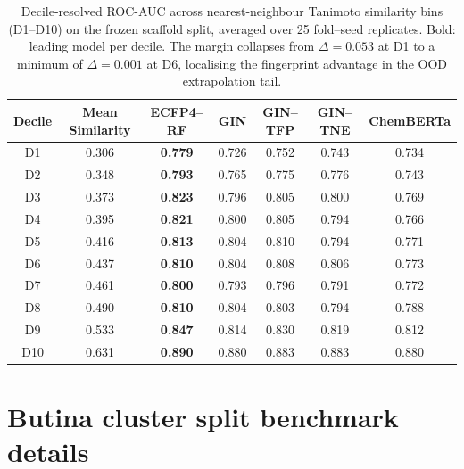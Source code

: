 \documentclass[11pt,a4paper]{article}
\begin{document}
\begin{table}[h]
\centering
\caption{Decile-resolved ROC-AUC across nearest-neighbour Tanimoto similarity bins (D1--D10) on the frozen scaffold split, averaged over \num{25} fold--seed replicates. Bold: leading model per decile. The margin collapses from $\Delta = \num{0.053}$ at D1 to a minimum of $\Delta = \num{0.001}$ at D6, localising the fingerprint advantage in the OOD extrapolation tail.}
\label{tab:s5_nn_deciles}
\small
\begin{tabular}{ccccccc}
\toprule
Decile & Mean Similarity & ECFP4--RF & GIN & GIN--TFP & GIN--TNE & ChemBERTa \\
\midrule
D1 & \num{0.306} & \textbf{\num{0.779}} & \num{0.726} & \num{0.752} & \num{0.743} & \num{0.734} \\
D2 & \num{0.348} & \textbf{\num{0.793}} & \num{0.765} & \num{0.775} & \num{0.776} & \num{0.743} \\
D3 & \num{0.373} & \textbf{\num{0.823}} & \num{0.796} & \num{0.805} & \num{0.800} & \num{0.769} \\
D4 & \num{0.395} & \textbf{\num{0.821}} & \num{0.800} & \num{0.805} & \num{0.794} & \num{0.766} \\
D5 & \num{0.416} & \textbf{\num{0.813}} & \num{0.804} & \num{0.810} & \num{0.794} & \num{0.771} \\
D6 & \num{0.437} & \textbf{\num{0.810}} & \num{0.804} & \num{0.808} & \num{0.806} & \num{0.773} \\
D7 & \num{0.461} & \textbf{\num{0.800}} & \num{0.793} & \num{0.796} & \num{0.791} & \num{0.772} \\
D8 & \num{0.490} & \textbf{\num{0.810}} & \num{0.804} & \num{0.803} & \num{0.794} & \num{0.788} \\
D9 & \num{0.533} & \textbf{\num{0.847}} & \num{0.814} & \num{0.830} & \num{0.819} & \num{0.812} \\
D10 & \num{0.631} & \textbf{\num{0.890}} & \num{0.880} & \num{0.883} & \num{0.883} & \num{0.880} \\
\bottomrule
\end{tabular}
\end{table}

\section{Butina cluster split benchmark details}
\label{sec:butina_si}
\end{document}
